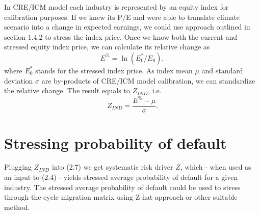 \documentclass[a4paper]{book}
\begin{document}
In CRE/ICM model each industry is represented by an equity index for calibration purposes. If we knew its P/E and were able to translate climate scenario into a change in expected earnings, we could use approach outlined in section 1.4.2 to stress the index price. Once we know both the current and stressed equity index price, we can calculate its relative change as
\begin{equation}
E^{\%} = \ln(E^*_0 / E_0),
\end{equation}
where $E^*_0$ stands for the stressed index price. As index mean $\mu$ and standard deviation $\sigma$ are by-products of CRE/ICM model calibration, we can standardize the relative change. The result equals to $Z_{IND}$, i.e.
\begin{equation}
Z_{IND} = \frac{E^{\%} - \mu}{\sigma}.
\end{equation}

\section{Stressing probability of default}

Plugging $Z_{IND}$ into (2.7) we get systematic risk driver $Z$, which - when used as an input to (2.4) - yields stressed average probability of default for a given industry. The stressed average probability of default could be used to stress through-the-cycle migration matrix using Z-hat approach or other suitable method.
\end{document}
